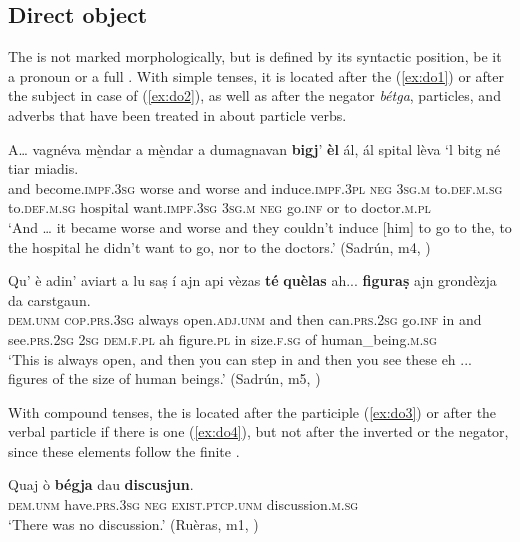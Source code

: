 \subsection{Direct object}\label{sec:4.2.2}
The  is not marked morphologically, but is defined by its syntactic position, be it a pronoun or a full . With simple tenses, it is located after the  (\ref{ex:do1}) or after the subject in case of  (\ref{ex:do2}), as well as after the negator \textit{bétga}, particles, and adverbs that have been treated in  about particle verbs.

\ea
\label{ex:do1}
\gll  A… vagnéva mè̱ndar a mè̱ndar a dumagnavan \textbf{bigj}' {\ob}\textbf{èl}{\cb} ál, ál spital lèva  `l bitg  né tiar miadis.  \\
and become.\textsc{impf.3sg} worse and worse and induce.\textsc{impf.3pl} \textsc{neg} \textsc{3sg.m} to.\textsc{def.m.sg} to.\textsc{def.m.sg} hospital want.\textsc{impf.3sg} \textsc{3sg.m} \textsc{neg} go.\textsc{inf} or to doctor.\textsc{m.pl} \\
\glt `And … it became worse and worse and they couldn’t induce [him] to go to the, to the hospital he didn’t want to go, nor to the doctors.' (Sadrún, m4, )
\z

\ea\label{ex:do2}
\gll  Qu’ è adin' aviart a lu saṣ í ajn api vèzas {\ob}\textbf{té}{\cb} {\ob}\textbf{quèlas} ah... \textbf{figuraṣ}{\cb} ajn grondèzja da carstgaun.\\
\textsc{dem.unm} \textsc{cop.prs.3sg} always open.\textsc{adj.unm} and then can.\textsc{prs.2sg} go.\textsc{inf} in and see.\textsc{prs.2sg} \textsc{2sg} \textsc{dem.f.pl} ah figure.\textsc{pl} in size.\textsc{f.sg} of human\_being.\textsc{m.sg} \\
\glt `This is always open, and then you can step in and then you see these eh ... figures of the size of human beings.' (Sadrún, m5, )
\z

With compound tenses, the  is located after the participle (\ref{ex:do3}) or after the verbal particle if there is one (\ref{ex:do4}), but not after the inverted  or the negator, since these elements follow the finite .

\ea\label{ex:do3}
\gll    Quaj ò \textbf{bégja} dau {\ob}\textbf{discusjun}{\cb}.\\
\textsc{dem.unm} have.\textsc{prs.3sg} \textsc{neg} \textsc{exist.ptcp.unm} discussion.\textsc{m.sg}\\
\glt `There was no discussion.' (Ruèras, m1, )
\z

